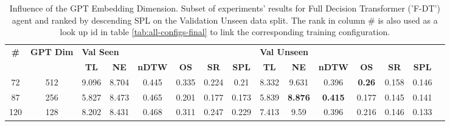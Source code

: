 \begin{table}
\centering
\caption{\label{tab:f_dt_dim_test}Influence of the GPT Embedding Dimension. Subset of experiments' results for Full Decision Transformer ('F-DT') agent and ranked by descending SPL on the Validation Unseen data split. The rank in column \# is also used as a look up id in table \ref{tab:all-configs-final} to link the corresponding training configuration.}
\begin{tabular}{@{\hskip3pt}c@{\hskip3pt}c@{\hskip3pt}c@{\hskip3pt}c@{\hskip3pt}c@{\hskip3pt}c@{\hskip3pt}c@{\hskip3pt}c@{\hskip3pt}c@{\hskip3pt}c@{\hskip3pt}c@{\hskip3pt}c@{\hskip3pt}c@{\hskip3pt}c@{\hskip3pt}c}
\toprule
\textbf{\#} & \textbf{GPT Dim} & \multicolumn{6}{l}{\textbf{Val Seen}} & \multicolumn{6}{l}{\textbf{Val Unseen}} \\
 \textbf{~} &       \textbf{~} &       \textbf{TL} & \textbf{NE} & \textbf{nDTW} & \textbf{OS} & \textbf{SR} & \textbf{SPL} &         \textbf{TL} &     \textbf{NE} &   \textbf{nDTW} &    \textbf{OS} & \textbf{SR} & \textbf{SPL} \\
\midrule
         72 &              512 &             9.096 &       8.704 &         0.445 &       0.335 &       0.224 &         0.21 &               8.332 &           9.631 &           0.396 &  \textbf{0.26} &       0.158 &        0.146 \\
         87 &              256 &             5.827 &       8.473 &         0.465 &       0.201 &       0.177 &        0.173 &               5.839 &  \textbf{8.876} &  \textbf{0.415} &          0.177 &       0.145 &        0.141 \\
        120 &              128 &             8.202 &       8.431 &         0.468 &       0.311 &       0.247 &        0.229 &               7.413 &            9.59 &           0.396 &          0.216 &       0.146 &        0.133 \\
\bottomrule
\end{tabular}
\end{table}

